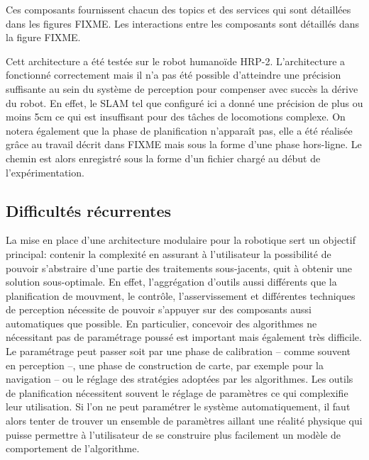 Ces composants fournissent chacun des topics et des services qui sont
détaillées dans les figures FIXME. Les interactions entre les
composants sont détaillés dans la figure FIXME.


Cett architecture a été testée sur le robot humanoïde
HRP-2. L'architecture a fonctionné correctement mais il n'a pas été
possible d'atteindre une précision suffisante au sein du système de
perception pour compenser avec succès la dérive du robot. En effet, le
SLAM tel que configuré ici a donné une précision de plus ou moins 5cm
ce qui est insuffisant pour des tâches de locomotions complexe. On
notera également que la phase de planification n'apparaît pas, elle a
été réalisée grâce au travail décrit dans FIXME mais sous la forme
d'une phase hors-ligne. Le chemin est alors enregistré sous la forme
d'un fichier chargé au début de l'expérimentation.


\subsection{Difficultés récurrentes}

La mise en place d'une architecture modulaire pour la robotique sert
un objectif principal: contenir la complexité en assurant à
l'utilisateur la possibilité de pouvoir s'abstraire d'une partie des
traitements sous-jacents, quit à obtenir une solution
sous-optimale. En effet, l'aggrégation d'outils aussi différents que
la planification de mouvment, le contrôle, l'asservissement et
différentes techniques de perception nécessite de pouvoir s'appuyer
sur des composants aussi automatiques que possible. En particulier,
concevoir des algorithmes ne nécessitant pas de paramétrage poussé est
important mais également très difficile. Le paramétrage peut passer
soit par une phase de calibration -- comme souvent en perception --,
une phase de construction de carte, par exemple pour la navigation --
ou le réglage des stratégies adoptées par les algorithmes. Les outils
de planification nécessitent souvent le réglage de paramètres ce qui
complexifie leur utilisation. Si l'on ne peut paramétrer le système
automatiquement, il faut alors tenter de trouver un ensemble de
paramètres aillant une réalité physique qui puisse permettre à
l'utilisateur de se construire plus facilement un modèle de
comportement de l'algorithme.


